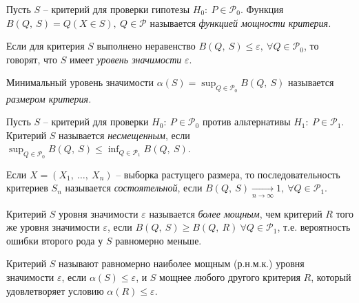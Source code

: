 \begin{definition}
    Пусть $\displaystyle S$ -- критерий для проверки гипотезы $\displaystyle H_{0} :\ P\in \mathcal{P}_{0}$. Функция $\displaystyle B( Q,\ S) =Q( X\in S) ,\ Q\in \mathcal{P}$ называется \textit{функцией мощности критерия}\textit{.}
\end{definition}
\begin{definition}
    Если для критерия $\displaystyle S$ выполнено неравенство $\displaystyle B( Q,\ S) \leqslant \varepsilon ,\ \forall Q\in \mathcal{P}_{0}$, то говорят, что $\displaystyle S$ имеет \textit{уровень значимости}\textit{ }$\displaystyle \varepsilon $.
\end{definition}
\begin{definition}
    Минимальный уровень значимости $\displaystyle \alpha ( S) =\sup _{Q\in \mathcal{P}_{0}} B( Q,\ S)$ называется \textit{размером критерия}\textit{.}
\end{definition}
\begin{definition}
    Пусть $\displaystyle S$ -- критерий для проверки $\displaystyle H_{0} :\ P\in \mathcal{P}_{0}$ против альтернативы $\displaystyle H_{1} :\ P\in \mathcal{P}_{1}$. Критерий $\displaystyle S$ называется \textit{несмещенным}, если $\displaystyle \sup _{Q\in \mathcal{P}_{0}} B( Q,\ S) \leqslant \inf_{Q\in \mathcal{P}_{1}} B( Q,\ S)$.
\end{definition}
\begin{definition}
    Если $\displaystyle X=( X_{1} ,\ \dotsc ,\ X_{n})$ -- выборка растущего размера, то последовательность критериев $\displaystyle S_{n}$ называется \textit{состоятельной}, если $\displaystyle B( Q,\ S)\xrightarrow[n\rightarrow \infty ]{} 1,\ \forall Q\in \mathcal{P}_{1}$.
\end{definition}
\begin{definition}
    Критерий $S$ уровня значимости $\displaystyle \varepsilon $ называется \textit{более мощным}, чем критерий $\displaystyle R$ того же уровня значимости $\displaystyle \varepsilon $, если $\displaystyle B( Q,\ S) \geqslant B( Q,\ R) \ \forall Q\in \mathcal{P}_{1}$, т.е. вероятность ошибки второго рода у $\displaystyle S$ равномерно меньше.
\end{definition}
\begin{definition}
    Критерий $\displaystyle S$ называют равномерно наиболее мощным (р.н.м.к.) уровня значимости $\displaystyle \varepsilon $, если $\displaystyle \alpha ( S) \leqslant \varepsilon $, и $\displaystyle S$ мощнее любого другого критерия $\displaystyle R$, который удовлетворяет условию $\displaystyle \alpha ( R) \leqslant \varepsilon $.
\end{definition}
